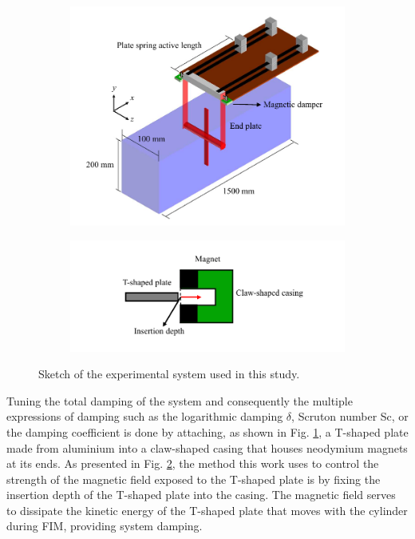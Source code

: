 \documentclass[oneside]{utmthesis}
\begin{document}
\begin{figure}
  \centering
  \begin{subfigure}[h]{1\textwidth}
    \includegraphics[width=\textwidth]{figs/rigSketch}
    \caption{}
    \label{fig:rigSketch}
  \end{subfigure}

  \begin{subfigure}[h]{1\textwidth}
    \includegraphics[width=\textwidth]{figs/damperSketch}
    \caption{}
    \label{fig:damperSketch}
  \end{subfigure}

  \caption{Sketch of the experimental system used in this study.} \label{fig:experimentalSetup}
\end{figure}

Tuning the total damping of the system and consequently the multiple expressions of damping such as the logarithmic damping $\delta$, Scruton number Sc, or the damping coefficient is done by attaching, as shown in Fig. \ref{fig:rigSketch}, a T-shaped plate made from aluminium into a claw-shaped casing that houses neodymium magnets at its ends. As presented in Fig. \ref{fig:damperSketch}, the method this work uses to control the strength of the magnetic field exposed to the T-shaped plate is by fixing the insertion depth of the T-shaped plate into the casing. The magnetic field serves to dissipate the kinetic energy of the T-shaped plate that moves with the cylinder during FIM, providing system damping.
\end{document}
